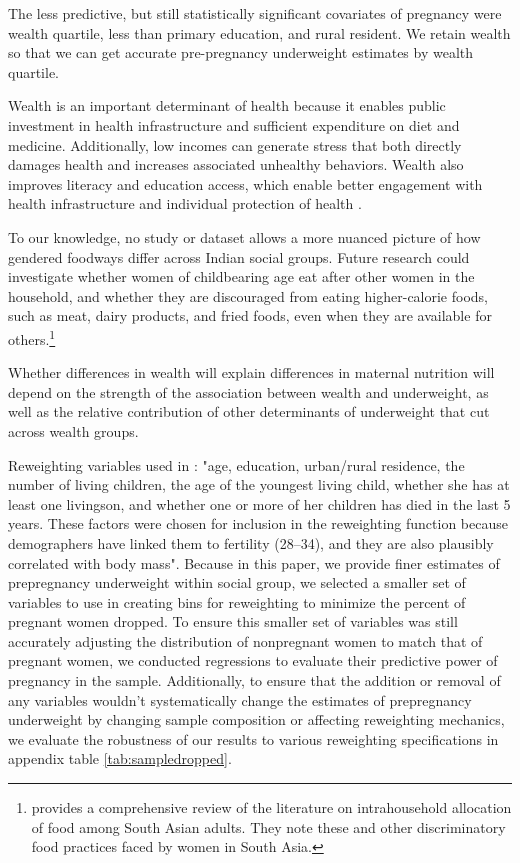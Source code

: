 The less predictive, but still statistically significant covariates of pregnancy were wealth quartile, less than primary education, and rural resident. We retain wealth so that we can get accurate pre-pregnancy underweight estimates by wealth quartile. 


Wealth is an important determinant of health because it enables public investment in health infrastructure and sufficient expenditure on diet and medicine. Additionally, low incomes can generate stress that both directly damages health and increases associated unhealthy behaviors. Wealth also improves literacy and education access, which enable better engagement with health infrastructure and individual protection of health \citep{rajan2013wealthier}. 


To our knowledge, no study or dataset allows a more nuanced picture of how gendered foodways differ across Indian social groups.  Future research could investigate whether  women of childbearing age eat after other women in the household, and whether they are discouraged from eating higher-calorie foods, such as meat, dairy products, and fried foods, even when they are available for others.\footnote{\cite{harris2017determinants} provides a comprehensive review of the literature on intrahousehold allocation of food among South Asian adults.  They note these and other discriminatory food practices faced by women in South Asia.}  


Whether differences in wealth will explain differences in maternal nutrition will depend on the strength of the association between wealth and underweight, as well as the relative contribution of other determinants of underweight that cut across wealth groups. 


Reweighting variables used in \cite{coffey2015prepregnancy}: "age, education, urban/rural residence, the number of living children, the age of the youngest living child, whether she has at least one livingson, and whether one or more of her children has died in the last 5 years. These factors were chosen for inclusion in the reweighting function because demographers have linked them to fertility (28–34), and they are also plausibly correlated with body mass". Because in this paper, we provide finer estimates of prepregnancy underweight within social group, we selected a smaller set of variables to use in creating bins for reweighting to minimize the percent of pregnant women dropped. To ensure this smaller set of variables was still accurately adjusting the distribution of nonpregnant women to match that of pregnant women, we conducted regressions to evaluate their predictive power of pregnancy in the sample. Additionally, to ensure that the addition or removal of any variables wouldn't systematically change the estimates of prepregnancy underweight by changing sample composition or affecting reweighting mechanics, we evaluate the robustness of our results to various reweighting specifications in appendix table \ref{tab:sampledropped}.


